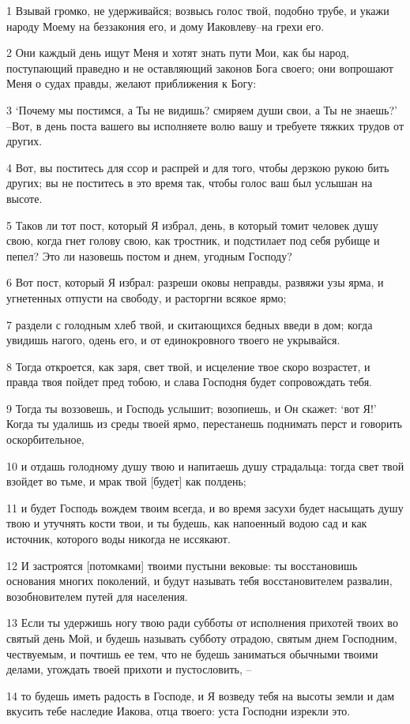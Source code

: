 \par 1 Взывай громко, не удерживайся; возвысь голос твой, подобно трубе, и укажи народу Моему на беззакония его, и дому Иаковлеву--на грехи его.
\par 2 Они каждый день ищут Меня и хотят знать пути Мои, как бы народ, поступающий праведно и не оставляющий законов Бога своего; они вопрошают Меня о судах правды, желают приближения к Богу:
\par 3 `Почему мы постимся, а Ты не видишь? смиряем души свои, а Ты не знаешь?' --Вот, в день поста вашего вы исполняете волю вашу и требуете тяжких трудов от других.
\par 4 Вот, вы поститесь для ссор и распрей и для того, чтобы дерзкою рукою бить других; вы не поститесь в это время так, чтобы голос ваш был услышан на высоте.
\par 5 Таков ли тот пост, который Я избрал, день, в который томит человек душу свою, когда гнет голову свою, как тростник, и подстилает под себя рубище и пепел? Это ли назовешь постом и днем, угодным Господу?
\par 6 Вот пост, который Я избрал: разреши оковы неправды, развяжи узы ярма, и угнетенных отпусти на свободу, и расторгни всякое ярмо;
\par 7 раздели с голодным хлеб твой, и скитающихся бедных введи в дом; когда увидишь нагого, одень его, и от единокровного твоего не укрывайся.
\par 8 Тогда откроется, как заря, свет твой, и исцеление твое скоро возрастет, и правда твоя пойдет пред тобою, и слава Господня будет сопровождать тебя.
\par 9 Тогда ты воззовешь, и Господь услышит; возопиешь, и Он скажет: `вот Я!' Когда ты удалишь из среды твоей ярмо, перестанешь поднимать перст и говорить оскорбительное,
\par 10 и отдашь голодному душу твою и напитаешь душу страдальца: тогда свет твой взойдет во тьме, и мрак твой [будет] как полдень;
\par 11 и будет Господь вождем твоим всегда, и во время засухи будет насыщать душу твою и утучнять кости твои, и ты будешь, как напоенный водою сад и как источник, которого воды никогда не иссякают.
\par 12 И застроятся [потомками] твоими пустыни вековые: ты восстановишь основания многих поколений, и будут называть тебя восстановителем развалин, возобновителем путей для населения.
\par 13 Если ты удержишь ногу твою ради субботы от исполнения прихотей твоих во святый день Мой, и будешь называть субботу отрадою, святым днем Господним, чествуемым, и почтишь ее тем, что не будешь заниматься обычными твоими делами, угождать твоей прихоти и пустословить, --
\par 14 то будешь иметь радость в Господе, и Я возведу тебя на высоты земли и дам вкусить тебе наследие Иакова, отца твоего: уста Господни изрекли это.


